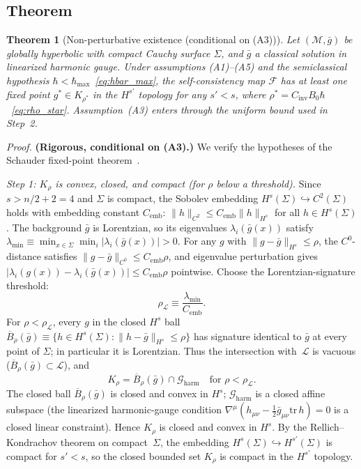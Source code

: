 \documentclass[12pt,a4paper]{article}
\newtheorem{theorem}{Theorem}
\begin{document}
\subsection{Theorem}

\begin{theorem}[Non-perturbative existence (conditional on (A3))]
\label{thm:schauder}
Let $(\mathcal{M},\bar{g})$ be globally hyperbolic with compact Cauchy surface $\Sigma$,
and $\bar{g}$ a classical solution in linearized harmonic gauge. Under assumptions
\emph{(A1)--(A5)} and the semiclassical hypothesis
$\hbar < \hbar_{\max}$~\eqref{eq:hbar_max}, the self-consistency map $\mathcal{F}$ has at
least one fixed point $g^* \in K_{\rho^*}$ in the $H^{s'}$ topology for any $s' < s$,
where $\rho^* = C_{\text{inv}}B_0\hbar$~\eqref{eq:rho_star}. Assumption~(A3) enters
through the uniform bound used in Step~2.
\end{theorem}

\noindent\emph{Proof.} \textbf{(Rigorous, conditional on (A3).)} We verify the hypotheses
of the Schauder fixed-point theorem~\cite{schauder}.

\smallskip\noindent\textit{Step 1: $K_\rho$ is convex, closed, and compact (for $\rho$
below a threshold).}
Since $s > n/2 + 2 = 4$ and $\Sigma$ is compact, the Sobolev embedding
$H^s(\Sigma) \hookrightarrow C^2(\Sigma)$ holds with embedding constant $C_{\mathrm{emb}}$:
$\|h\|_{C^2} \leq C_{\mathrm{emb}}\|h\|_{H^s}$ for all $h \in H^s(\Sigma)$.
The background $\bar{g}$ is Lorentzian, so its eigenvalues $\lambda_i(\bar{g}(x))$ satisfy
$\lambda_{\min} \equiv \min_{x \in \Sigma}\min_i |\lambda_i(\bar{g}(x))| > 0$.
For any $g$ with $\|g - \bar{g}\|_{H^s} \leq \rho$, the $C^0$-distance satisfies
$\|g - \bar{g}\|_{C^0} \leq C_{\mathrm{emb}}\rho$, and eigenvalue perturbation gives
$|\lambda_i(g(x)) - \lambda_i(\bar{g}(x))| \leq C_{\mathrm{emb}}\rho$ pointwise.
Choose the Lorentzian-signature threshold:
\begin{equation}
\rho_{\mathcal{L}} \equiv \frac{\lambda_{\min}}{C_{\mathrm{emb}}}.
\label{eq:rho_L}
\end{equation}
For $\rho < \rho_{\mathcal{L}}$, every $g$ in the closed $H^s$ ball
$\overline{B}_\rho(\bar{g}) \equiv \{h \in H^s(\Sigma) : \|h - \bar{g}\|_{H^s} \leq \rho\}$
has signature identical to $\bar{g}$ at every point of $\Sigma$; in particular it is
Lorentzian. Thus the intersection with~$\mathcal{L}$ is vacuous
($\overline{B}_\rho(\bar{g}) \subset \mathcal{L}$), and
\[
K_\rho = \overline{B}_\rho(\bar{g}) \cap \mathcal{G}_{\text{harm}}
\quad \text{for } \rho < \rho_{\mathcal{L}}.
\]
The closed ball $\overline{B}_\rho(\bar{g})$ is closed and convex in $H^s$;
$\mathcal{G}_{\text{harm}}$ is a closed affine subspace (the linearized harmonic-gauge
condition $\nabla^\mu(h_{\mu\nu} - \tfrac{1}{2}\bar{g}_{\mu\nu}\mathrm{tr}\,h) = 0$ is
a closed linear constraint). Hence $K_\rho$ is closed and convex in $H^s$.
By the Rellich--Kondrachov theorem on compact~$\Sigma$, the embedding
$H^s(\Sigma) \hookrightarrow H^{s'}(\Sigma)$ is compact for $s' < s$, so the closed
bounded set $K_\rho$ is compact in the $H^{s'}$ topology.
\end{document}
